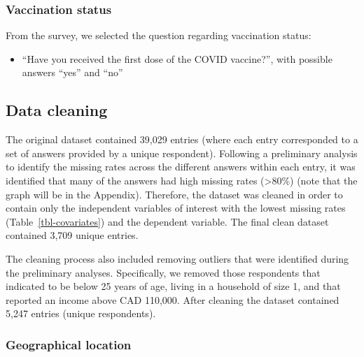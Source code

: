 \documentclass[
  letterpaper,
  DIV=11,
  numbers=noendperiod]{scrartcl}
\providecommand{\tightlist}{%
  \setlength{\itemsep}{0pt}\setlength{\parskip}{0pt}}\usepackage{longtable,booktabs,array}
\begin{document}
\hypertarget{vaccination-status}{%
\subsubsection{Vaccination status}\label{vaccination-status}}

From the survey, we selected the question regarding vaccination status:

\begin{itemize}
\tightlist
\item
  ``Have you received the first dose of the COVID vaccine?'', with
  possible answers ``yes'' and ``no''
\end{itemize}

\hypertarget{data-cleaning}{%
\subsection{Data cleaning}\label{data-cleaning}}

The original dataset contained 39,029 entries (where each entry
corresponded to a set of answers provided by a unique respondent).
Following a preliminary analysis to identify the missing rates across
the different answers within each entry, it was identified that many of
the answers had high missing rates (\textgreater80\%) (note that the
graph will be in the Appendix). Therefore, the dataset was cleaned in
order to contain only the independent variables of interest with the
lowest missing rates (Table~\ref{tbl-covariates}) and the dependent
variable. The final clean dataset contained 3,709 unique entries.

The cleaning process also included removing outliers that were
identified during the preliminary analyses. Specifically, we removed
those respondents that indicated to be below 25 years of age, living in
a household of size 1, and that reported an income above CAD 110,000.
After cleaning the dataset contained 5,247 entries (unique respondents).

\hypertarget{sec-geographical-location}{%
\subsubsection{Geographical location}\label{sec-geographical-location}}
\end{document}
